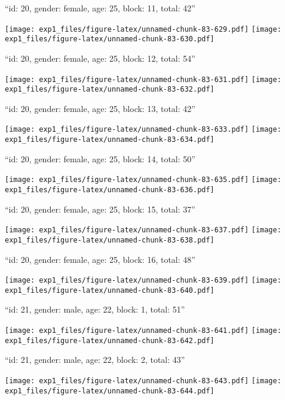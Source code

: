 \documentclass[11pt,,]{article}
\begin{document}
\newpage
[1] 

``id: 20, gender: female, age: 25, block: 11, total: 42''

\texttt{[image: exp1\_files/figure-latex/unnamed-chunk-83-629.pdf]}
\texttt{[image: exp1\_files/figure-latex/unnamed-chunk-83-630.pdf]}

\newpage
[1] 

``id: 20, gender: female, age: 25, block: 12, total: 54''

\texttt{[image: exp1\_files/figure-latex/unnamed-chunk-83-631.pdf]}
\texttt{[image: exp1\_files/figure-latex/unnamed-chunk-83-632.pdf]}

\newpage
[1] 

``id: 20, gender: female, age: 25, block: 13, total: 42''

\texttt{[image: exp1\_files/figure-latex/unnamed-chunk-83-633.pdf]}
\texttt{[image: exp1\_files/figure-latex/unnamed-chunk-83-634.pdf]}

\newpage
[1] 

``id: 20, gender: female, age: 25, block: 14, total: 50''

\texttt{[image: exp1\_files/figure-latex/unnamed-chunk-83-635.pdf]}
\texttt{[image: exp1\_files/figure-latex/unnamed-chunk-83-636.pdf]}

\newpage
[1] 

``id: 20, gender: female, age: 25, block: 15, total: 37''

\texttt{[image: exp1\_files/figure-latex/unnamed-chunk-83-637.pdf]}
\texttt{[image: exp1\_files/figure-latex/unnamed-chunk-83-638.pdf]}

\newpage
[1] 

``id: 20, gender: female, age: 25, block: 16, total: 48''

\texttt{[image: exp1\_files/figure-latex/unnamed-chunk-83-639.pdf]}
\texttt{[image: exp1\_files/figure-latex/unnamed-chunk-83-640.pdf]}

\newpage
[1] 

``id: 21, gender: male, age: 22, block: 1, total: 51''

\texttt{[image: exp1\_files/figure-latex/unnamed-chunk-83-641.pdf]}
\texttt{[image: exp1\_files/figure-latex/unnamed-chunk-83-642.pdf]}

\newpage
[1] 

``id: 21, gender: male, age: 22, block: 2, total: 43''

\texttt{[image: exp1\_files/figure-latex/unnamed-chunk-83-643.pdf]}
\texttt{[image: exp1\_files/figure-latex/unnamed-chunk-83-644.pdf]}
\end{document}
